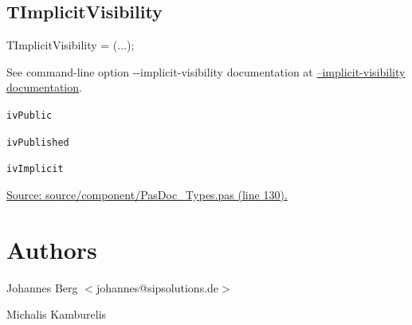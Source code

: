 \documentclass{report}
\newif\ifpdf
\begin{document}
\subsection*{TImplicitVisibility}
\fi
\label{PasDoc_Types-TImplicitVisibility}
\begin{list}{}{
\setlength{\itemindent}{0cm}
\setlength{\listparindent}{0cm}
\setlength{\leftmargin}{\evensidemargin}
\addtolength{\leftmargin}{\tmplength}
\settowidth{\labelsep}{X}
\addtolength{\leftmargin}{\labelsep}
\setlength{\labelwidth}{\tmplength}
}
\item[\textbf{Declaration}\hfill]
\ifpdf
\begin{flushleft}
\fi
\begin{ttfamily}
TImplicitVisibility = (...);\end{ttfamily}

\ifpdf
\end{flushleft}
\fi

\par
\item[\textbf{Description}]
See command{-}line option {-}{-}implicit{-}visibility documentation at \href{https://pasdoc.github.io/ImplicitVisibilityOption}{--implicit-visibility documentation}.\item[\textbf{Values}]
\begin{description}
\item[\texttt{ivPublic}] \label{PasDoc_Types-ivPublic}
\index{}
 
\item[\texttt{ivPublished}] \label{PasDoc_Types-ivPublished}
\index{}
 
\item[\texttt{ivImplicit}] \label{PasDoc_Types-ivImplicit}
\index{}
 
\end{description}
\par
\href{https://github.com/pasdoc/pasdoc/blob/master/source/component/PasDoc_Types.pas#L130}{Source: source/component/PasDoc{\_}Types.pas (line 130).}

\end{list}
\section{Authors}
\par
Johannes Berg {$<$}johannes@sipsolutions.de{$>$}

\par
Michalis Kamburelis
\end{document}
